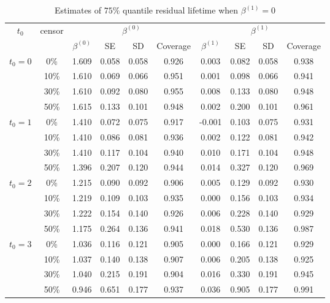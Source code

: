 \documentclass[titlepage,english,12pt]{article}
\begin{document}
	\begin{table}[H] \label{table:3}
		\caption{Estimates of $75\%$ quantile residual lifetime when $\beta^{(1)}=0$}
		\centering
		\begin{tabular}{|c|c|c|c|c|c|c|c|c|c|}
			\hline
			\multirow{2}{*}{$t_0$} & \multirow{2}{*}{censor} & \multicolumn{4}{c|}{$\beta^{(0)}$} & \multicolumn{4}{c|}{$\beta^{(1)}$}\\ \cline{3-10}
			& & $\beta^{(0)}$ & SE & SD  & Coverage  & $\beta^{(1)}$ & SE & SD & Coverage\\
			\hline\hline
			\multirow{4}{*}{$t_0=0$} & 0\% & 1.609 & 0.058 & 0.058 & 0.926 & 0.003 & 0.082 & 0.058 & 0.938 \\
			& 10\% & 1.610 & 0.069 & 0.066 & 0.951 & 0.001 & 0.098 & 0.066 & 0.941 \\
			& 30\% & 1.610 & 0.092 & 0.080 & 0.955 & 0.008 & 0.133 & 0.080 & 0.948 \\
			& 50\% & 1.615 & 0.133 & 0.101 & 0.948 & 0.002 & 0.200 & 0.101 & 0.961 \\
			\hline
			\multirow{4}{*}{$t_0=1$} & 0\% & 1.410 & 0.072 & 0.075 & 0.917 & -0.001 & 0.103 & 0.075 & 0.931 \\
			& 10\% & 1.410 & 0.086 & 0.081 & 0.936 & 0.002 & 0.122 & 0.081 & 0.942 \\
			& 30\% & 1.410 & 0.117 & 0.104 & 0.940 & 0.010 & 0.171 & 0.104 & 0.948 \\
			& 50\% & 1.396 & 0.207 & 0.120 & 0.944 & 0.014 & 0.327 & 0.120 & 0.969 \\
			\hline
			\multirow{4}{*}{$t_0=2$} & 0\% & 1.215 & 0.090 & 0.092 & 0.906 & 0.005 & 0.129 & 0.092 & 0.930 \\
			& 10\% & 1.219 & 0.109 & 0.103 & 0.935 & 0.000 & 0.156 & 0.103 & 0.934 \\
			& 30\% & 1.222 & 0.154 & 0.140 & 0.926 & 0.006 & 0.228 & 0.140 & 0.929 \\
			& 50\% & 1.175 & 0.264 & 0.136 & 0.941 & 0.018 & 0.530 & 0.136 & 0.987 \\
			\hline
			\multirow{4}{*}{$t_0=3$} & 0\% & 1.036 & 0.116 & 0.121 & 0.905 & 0.000 & 0.166 & 0.121 & 0.929 \\
			& 10\% & 1.037 & 0.140 & 0.138 & 0.907 & 0.006 & 0.205 & 0.138 & 0.925 \\
			& 30\% & 1.040 & 0.215 & 0.191 & 0.904 & 0.016 & 0.330 & 0.191 & 0.945 \\
			& 50\% & 0.946 & 0.651 & 0.177 & 0.937 & 0.036 & 0.905 & 0.177 & 0.991 \\	
			\hline
		\end{tabular}
	\end{table}
\end{document}
